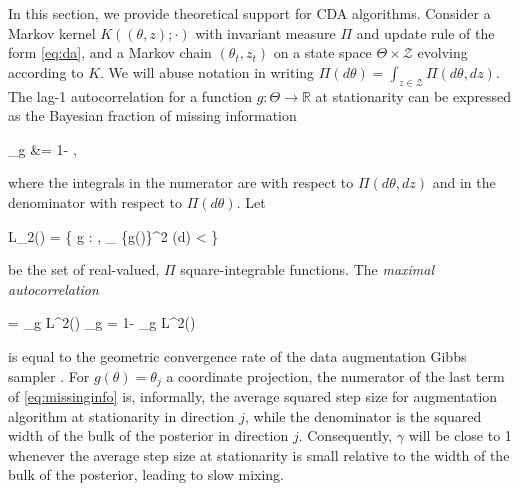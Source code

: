 \documentclass[10pt]{article}
\newcommand{\be}{\begin{equs}}
\newcommand{\ee}{\end{equs}}
\newcommand{\bb}[1]{\mathbb{#1}}
\newcommand{\mc}[1]{\mathcal{#1}}
\DeclareMathOperator{\var}{var}
\begin{document}
In this section, we provide theoretical support for CDA algorithms. Consider a Markov kernel $K((\theta,z);\cdot)$ with invariant measure $\Pi$ and update rule of the form \eqref{eq:da}, and a Markov chain $(\theta_t,z_t)$ on a state space $\Theta \times \mc Z$ evolving according to $K$. We will abuse notation in writing $\Pi(d\theta) = \int_{z \in \mc Z} \Pi(d\theta,dz)$. The lag-1 autocorrelation for a function $g : \Theta \to \bb R$ at stationarity can be expressed as the Bayesian fraction of missing information \citep{papaspiliopoulos2007general}
\be
\gamma_g &= 1- \frac{\bb E[\var(g(\theta) \mid z)]}{\var(g(\theta))}, \label{eq:missinginfo}
\ee
where the integrals in the numerator are with respect to $\Pi(d\theta,dz)$ and in the denominator with respect to $\Pi(d\theta)$. Let 
\be
L_2(\Pi) = \left\{ g : \Theta \to \bb R, \int_{\theta \in \Theta} \{g(\theta)\}^2 \Pi(d\theta) < \infty \right\} 
\ee
be the set of real-valued, $\Pi$ square-integrable functions. The \emph{maximal autocorrelation}
\be
\gamma = \sup_{g \in L^2(\Pi)} \gamma_g = 1- \inf_{g \in L^2(\Pi)} \frac{\bb E[\var(g(\theta) \mid z)]}{\var(g(\theta))}
\ee
is equal to the geometric convergence rate of the data augmentation Gibbs sampler \citep{liu2008monte}. For $g(\theta) = \theta_j$ a coordinate projection, the numerator of the last term of \eqref{eq:missinginfo} is, informally, the average squared step size for augmentation algorithm at stationarity in direction $j$, while the denominator is the squared width of the bulk of the posterior in direction $j$. Consequently, $\gamma$ will be close to 1 whenever the average step size at stationarity is small relative to the width of the bulk of the posterior, leading to slow mixing.
\end{document}
